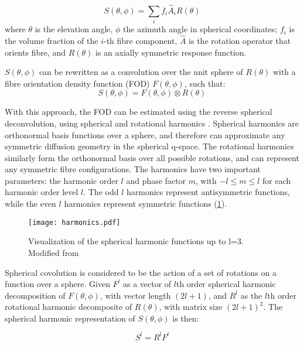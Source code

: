 \begin{equation}
S(\theta, \phi) = \sum_{i}^{} f_i \hat{A}_i R(\theta)
\end{equation}
where $\theta$ is the elevation angle,  $\phi$ the azimuth angle in spherical coordinates; $f_i$ is the volume fraction of the $i$-th fibre component, $\hat{A}$ is the rotation operator that orients fibre, and $R(\theta)$ is an axially symmetric response function. 

$S(\theta,\phi) $ can be rewritten as a convolution over the unit sphere of $R(\theta)$ with a fibre orientation density function (FOD) $F(\theta, \phi)$, such that:
\begin{equation}
S(\theta, \phi) = F(\theta, \phi) \otimes R(\theta)
\end{equation}

With this approach, the FOD can be estimated using the reverse spherical deconvolution, using spherical and rotational harmonics \cite{Healy1998}. Spherical harmonics are orthonormal basis functions over a sphere, and therefore can approximate any symmetric diffusion geometry in the spherical q-space. The rotational harmonics similarly form the orthonormal basis over all possible rotations, and can represent any symmetric fibre configurations. The harmonics have two important parameters: the harmonic order $l$ and phase factor $m$, with $ -l \leq m \leq l $ for each harmonic order level $l$. The odd $l$ harmonics represent antisymmetric functions, while the even $l$ harmonics represent symmetric functions (\ref{fig:harmonics}). 

\begin{figure}[ht]
\begin{center}
\texttt{[image: harmonics.pdf]}
\caption{Visualization of the spherical harmonic functions up to l=3. Modified from \protect\cite{sh-image-wikipedia}}
\label{fig:harmonics}
\end{center}
\end{figure}

Spherical covolution is considered to be the action of a set of rotations on a function over a sphere. Given $F^l $ as a vector of $l$th order spherical harmonic decomposition of  $F(\theta,\phi)$, with vector length $(2l + 1)$, and $R^l$ as the $l$th order rotational harmonic decomposite of $R(\theta)$, with matrix size $(2l+1)^2$. The spherical harmonic representation of $S(\theta,\phi)$ is then:

\begin{equation}
S^l = R^l F^l
\end{equation}

